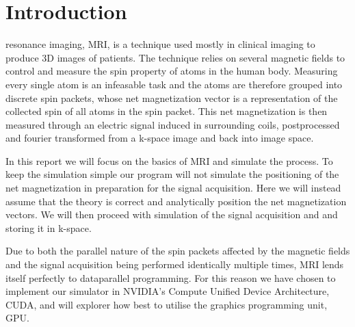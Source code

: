 


\section{Introduction}


 resonance imaging, MRI, is a technique used
mostly in clinical imaging to produce 3D images of patients. The
technique relies on several magnetic fields to control and measure the
spin property of atoms in the human body. Measuring every single atom
is an infeasable task and the atoms are therefore grouped into
discrete spin packets, whose net magnetization vector is a
representation of the collected spin of all atoms in the spin
packet. This net magnetization is then measured through an electric
signal induced in surrounding coils, postprocessed and fourier
transformed from a k-space image and back into image space.


In this report we will focus on the basics of MRI and simulate the
process. To keep the simulation simple our program will not simulate
the positioning of the net magnetization in preparation for the signal
acquisition. Here we will instead assume that the theory is correct
and analytically position the net magnetization vectors. We will then
proceed with simulation of the signal acquisition and and storing it
in k-space.


Due to both the parallel nature of the spin packets affected by the
magnetic fields and the signal acquisition being performed identically
multiple times, MRI lends itself perfectly to dataparallel
programming. For this reason we have chosen to implement our simulator
in NVIDIA's Compute Unified Device Architecture, CUDA, and will
explorer how best to utilise the graphics programming unit, GPU.




